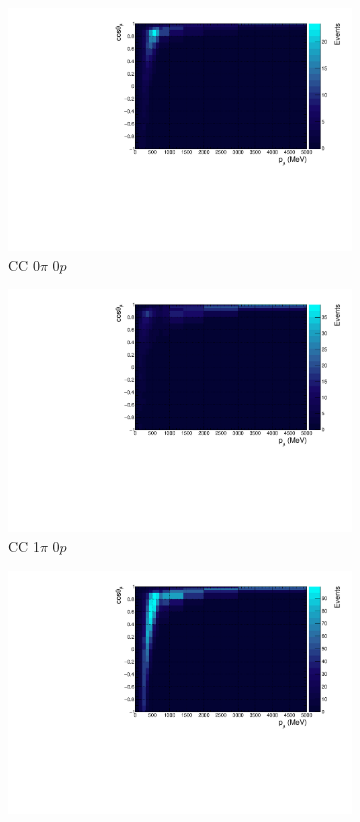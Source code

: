 \begin{figure}
\centering
\begin{subfigure}{.49\textwidth}
  \centering
  \includegraphics[width=0.9\linewidth]{figs/hptpc_pmtmuu_cc0pi0p.pdf}
  \caption{CC 0$\pi$ $0p$}
\end{subfigure}
\begin{subfigure}{.49\textwidth}
  \centering
  \includegraphics[width=0.9\linewidth]{figs/hptpc_pmtmuu_cc1pi0p.pdf}
  \caption{CC 1$\pi$ $0p$}
\end{subfigure}
\begin{subfigure}{.49\textwidth}
  \centering
  \includegraphics[width=0.9\linewidth]{figs/hptpc_pmtmuu_cc0pi1p.pdf}

\end{subfigure}
\end{figure}
